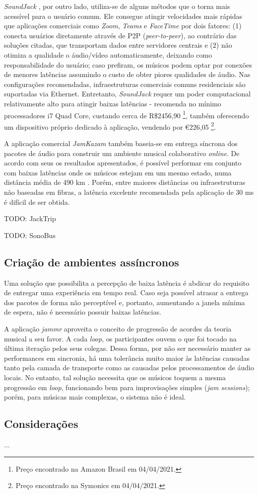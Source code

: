 \textit{SoundJack} \cite{soundjack}, por outro lado, utiliza-se de alguns métodos que o torna mais acessível para o usuário comum. Ele consegue atingir velocidades mais rápidas que aplicações comerciais como \textit{Zoom}, \textit{Teams} e \textit{FaceTime} por dois fatores: (1) conecta usuários diretamente através de P2P (\textit{peer-to-peer}), ao contrário das soluções citadas, que transportam dados entre servidores centrais e (2) não otimiza a qualidade o áudio/vídeo automaticamente, deixando como responsabilidade do usuário; caso prefiram, os músicos podem optar por conexões de menores latências assumindo o custo de obter piores qualidades de áudio. Nas configurações recomendadas, infraestruturas comerciais comuns residenciais são suportadas via Ethernet. Entretanto, \textit{SoundJack} requer um poder computacional relativamente alto para atingir baixas latências - recomenda no mínimo processadores i7 Quad Core, custando cerca de R\$2456,90 \footnote{Preço encontrado na Amazon Brasil em 04/04/2021.}, também oferecendo um dispositivo próprio dedicado à aplicação, vendendo por €226,05 \footnote{Preço encontrado na Symonics em 04/04/2021.}.

A aplicação comercial \textit{JamKazam} \cite{jamkazam} também baseia-se em entrega síncrona dos pacotes de áudio para construir um ambiente musical colaborativo \textit{online}. De acordo com seus os resultados apresentados, é possível performar em conjunto com baixas latências onde os músicos estejam em um mesmo estado, numa distância média de 490 km \cite{jamkazam_video}. Porém, entre maiores distâncias ou infraestruturas não baseadas em fibras, a latência excelente recomendada pela aplicação de 30 ms \cite{jamkazam_latencies} é difícil de ser obtida.

TODO: JackTrip

TODO: SonoBus

\subsection{Criação de ambientes assíncronos}

Uma solução que possibilita a percepção de baixa latência é abdicar do requisito de entregar uma experiência em tempo real. Caso seja possível atrasar a entrega dos pacotes de forma não perceptível e, portanto, aumentando a janela mínima de espera, não é necessário possuir baixas latências.

A aplicação \textit{jammr} \cite{jammr} aproveita o conceito de progressão de acordes da teoria musical a seu favor. A cada \textit{loop}, os participantes ouvem o que foi tocado na última iteração pelos seus colegas. Dessa forma, por não ser necessário manter as performances em sincronia, há uma tolerância muito maior às latências causadas tanto pela camada de transporte como as causadas pelos processamentos de áudio locais. No entanto, tal solução necessita que os músicos toquem a mesma progressão em \textit{loop}, funcionando bem para improvisações simples (\textit{jam sessions}); porém, para músicas mais complexas, o sistema não é ideal.

\subsection{Considerações}

...
